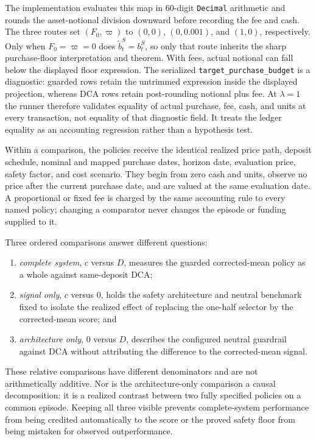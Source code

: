 \documentclass[12pt,a4paper,oneside]{report}
\begin{document}
The implementation evaluates this map in 60-digit \texttt{Decimal}
arithmetic and rounds the asset-notional division downward before recording
the fee and cash. The three routes set $(F_0,\varpi)$ to $(0,0)$, $(0,0.001)$,
and $(1,0)$, respectively. Only when $F_0=\varpi=0$ does
$\widetilde b_t^S=b_t^S$, so only that route inherits the sharp purchase-floor
interpretation and theorem. With fees, actual notional can fall below the
displayed floor expression. The serialized
\texttt{target\_purchase\_budget} is a diagnostic: guarded rows
retain the untrimmed expression inside the displayed projection, whereas DCA
rows retain post-rounding notional plus fee. At $\lambda=1$ the runner
therefore validates equality of actual purchase, fee, cash, and units at every
transaction, not equality of that diagnostic field. It treats the ledger
equality as an accounting regression rather than a hypothesis test.

Within a comparison, the policies receive the identical realized price path,
deposit schedule, nominal and mapped purchase dates, horizon date, evaluation
price, safety factor, and cost scenario. They begin from zero cash and units,
observe no price after the current purchase date, and are valued at the same
evaluation date. A proportional or fixed fee is charged by the same accounting
rule to every named policy; changing a comparator never changes the episode or
funding supplied to it.

Three ordered comparisons answer different questions:

\begin{enumerate}
  \item \emph{complete system}, $c$ versus $D$, measures the guarded
  corrected-mean policy as a whole against same-deposit DCA;
  \item \emph{signal only}, $c$ versus $0$, holds the safety architecture and
  neutral benchmark fixed to isolate the realized effect of replacing the
  one-half selector by the corrected-mean score; and
  \item \emph{architecture only}, $0$ versus $D$, describes the configured
  neutral guardrail against DCA without attributing the difference to the
  corrected-mean signal.
\end{enumerate}

These relative comparisons have different denominators and are not
arithmetically additive. Nor is the architecture-only comparison a causal
decomposition: it is a realized contrast between two fully specified policies
on a common episode. Keeping all three visible prevents complete-system
performance from being credited automatically to the score or the proved
safety floor from being mistaken for observed outperformance.
\end{document}
